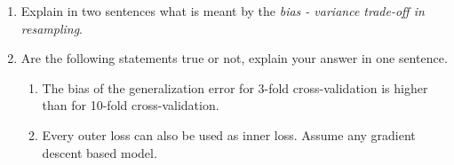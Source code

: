 \documentclass[a4paper]{article}
\makeatletter
\def\maxwidth{ %
  \ifdim\Gin@nat@width>\linewidth
    \linewidth
  \else
    \Gin@nat@width
  \fi
}
\newenvironment{knitrout}{}{} %
\makeatother
\begin{document}
{\begin{enumerate}
\begin{enumerate}
\begin{knitrout}
{\centering \texttt{[image: figure/unnamed-chunk-7-1]} 

}


\end{knitrout}




    \end{enumerate}

  \item
    Explain in two sentences what is meant by the \textit{bias - variance trade-off in resampling}.



  \item
    Are the following statements true or not, explain your answer in one sentence.
    \begin{enumerate}

      \item
        The bias of the generalization error for 3-fold cross-validation is higher than for 10-fold cross-validation.
   

      \item
        Every outer loss can also be used as inner loss. Assume any gradient descent based model.


    \end{enumerate}
\end{enumerate}
}
\end{document}
